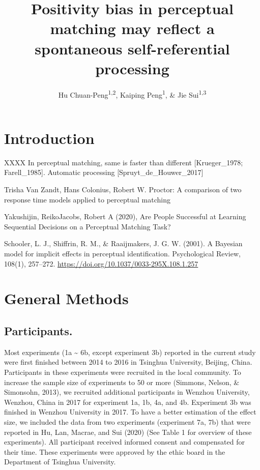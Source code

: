 \documentclass[
  english,
  man]{apa6}
\author{Hu Chuan-Peng\textsuperscript{1,2}, Kaiping Peng\textsuperscript{1}, \& Jie Sui\textsuperscript{1,3}}
\affiliation{
\vspace{0.5cm}
\textsuperscript{1} Tsinghua University, 100084 Beijing, China\\\textsuperscript{2} Leibniz Institute for Resilience Research, 55131 Mainz, Germany\\\textsuperscript{3} University of Aberdeen, Aberdeen, Scotland}
\title{Positivity bias in perceptual matching may reflect a spontaneous self-referential processing}
\date{}
\begin{document}
\maketitle

\hypertarget{introduction}{%
\section{Introduction}\label{introduction}}

XXXX
In perceptual matching, same is faster than different {[}Krueger\_1978; Farell\_1985{]}.
Automatic processing {[}Spruyt\_de\_Houwer\_2017{]}

Trisha Van Zandt, Hans Colonius, Robert W. Proctor: A comparison of two response time models applied to perceptual matching

Yakushijin, ReikoJacobs, Robert A (2020), Are People Successful at Learning Sequential Decisions on a Perceptual Matching Task?

Schooler, L. J., Shiffrin, R. M., \& Raaijmakers, J. G. W. (2001). A Bayesian model for implicit effects in perceptual identification. Psychological Review, 108(1), 257--272. \url{https://doi.org/10.1037/0033-295X.108.1.257}

\hypertarget{general-methods}{%
\section{General Methods}\label{general-methods}}

\hypertarget{participants.}{%
\subsection{Participants.}\label{participants.}}

Most experiments (1a \textasciitilde{} 6b, except experiment 3b) reported in the current study were first finished between 2014 to 2016 in Tsinghua University, Beijing, China. Participants in these experiments were recruited in the local community. To increase the sample size of experiments to 50 or more (Simmons, Nelson, \& Simonsohn, 2013), we recruited additional participants in Wenzhou University, Wenzhou, China in 2017 for experiment 1a, 1b, 4a, and 4b. Experiment 3b was finished in Wenzhou University in 2017. To have a better estimation of the effect size, we included the data from two experiments (experiment 7a, 7b) that were reported in Hu, Lan, Macrae, and Sui (2020) (See Table 1 for overview of these experiments).
All participant received informed consent and compensated for their time. These experiments were approved by the ethic board in the Department of Tsinghua University.
\end{document}
